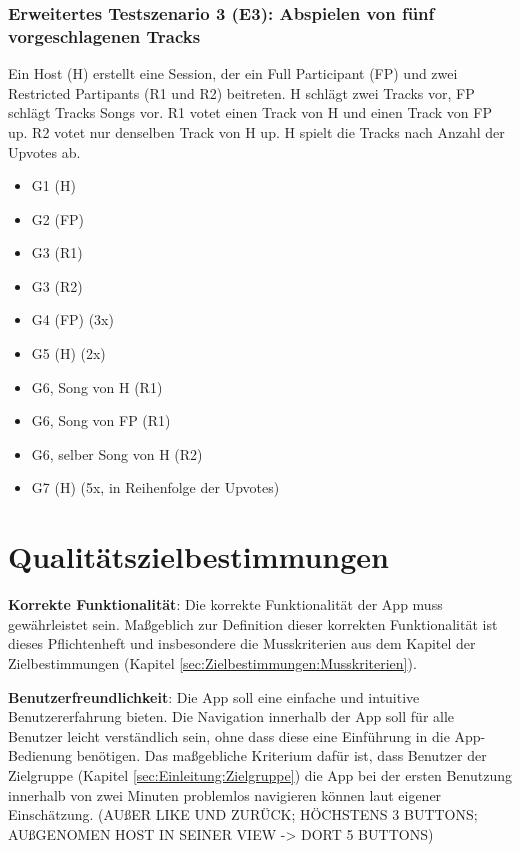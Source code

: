 \documentclass[oneside, ngerman]{sdqtechreport}
\begin{document}
\subsection{Erweitertes Testszenario 3 (E3): Abspielen von fünf vorgeschlagenen Tracks}
\label{subsec:Tests:ErweiterteTestszenarien:E3}
Ein Host (H) erstellt eine Session, der ein Full Participant (FP) und zwei Restricted Partipants (R1 und R2) beitreten. H schlägt zwei Tracks vor, FP schlägt Tracks Songs vor. R1 votet einen Track von H und einen Track von FP up. R2 votet nur denselben Track von H up. H spielt die Tracks nach Anzahl der Upvotes ab.
\begin{itemize}
    \item G1 (H)
    \item G2 (FP)
    \item G3 (R1)
    \item G3 (R2)
    \item G4 (FP) (3x)
    \item G5 (H) (2x)
    \item G6, Song von H (R1)
    \item G6, Song von FP (R1)
    \item G6, selber Song von H (R2)
    \item G7 (H) (5x, in Reihenfolge der Upvotes)
\end{itemize}



\chapter{Qualitätszielbestimmungen}
\label{chap:Qualitätszielbestimmungen}

\textbf{Korrekte Funktionalität}: Die korrekte Funktionalität der App muss gewährleistet sein. Maßgeblich zur Definition dieser korrekten Funktionalität ist dieses Pflichtenheft und insbesondere die Musskriterien aus dem Kapitel der Zielbestimmungen (Kapitel \ref{sec:Zielbestimmungen:Musskriterien}).

\textbf{Benutzerfreundlichkeit}: Die App soll eine einfache und intuitive Benutzererfahrung bieten. Die Navigation innerhalb der App soll für alle Benutzer leicht verständlich sein, ohne dass diese eine Einführung in die App-Bedienung benötigen. Das maßgebliche Kriterium dafür ist, dass Benutzer der Zielgruppe (Kapitel \ref{sec:Einleitung:Zielgruppe}) die App bei der ersten Benutzung innerhalb von zwei Minuten problemlos navigieren können laut eigener Einschätzung. (AUßER LIKE UND ZURÜCK; HÖCHSTENS 3 BUTTONS; AUßGENOMEN HOST IN SEINER VIEW -> DORT 5 BUTTONS)
\end{document}
